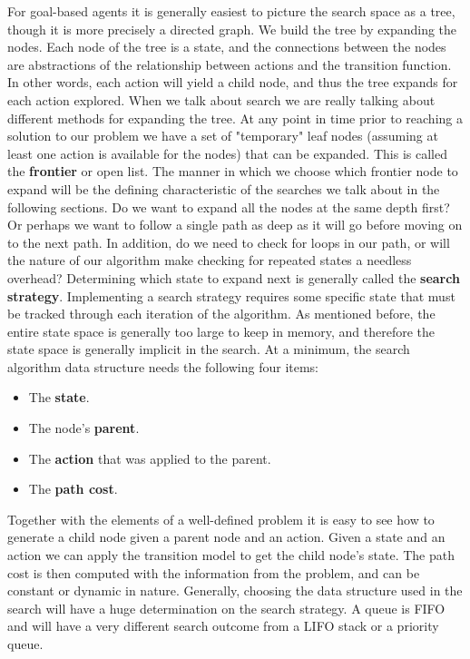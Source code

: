 \documentclass[a4paper,11pt]{report}
\begin{document}
For goal-based agents it is generally easiest to picture the search space as a
tree, though it is more precisely a directed graph.\cite{zhang99}  We build the
tree by expanding the nodes.  Each node of the tree is a state, and the
connections between the nodes are abstractions of the relationship between
actions and the transition function.  In other words, each action will yield a
child node, and thus the tree expands for each action explored.  When we talk
about search we are really talking about different methods for expanding the
tree.\newline
\indent At any point in time prior to reaching a solution to our problem we
have a set of "temporary" leaf nodes (assuming at least one action is available
for the nodes) that can be expanded.  This is called the \textbf{frontier}
or open list.\cite{norvig}  The manner in which we choose which frontier node
to expand will be the defining characteristic of the searches we talk about
in the following sections.  Do we want to expand all the nodes at the same
depth first?  Or perhaps we want to follow a single path as deep as it will go
before moving on to the next path.  In addition, do we need to check for loops
in our path, or will the nature of our algorithm make checking for repeated
states a needless overhead?  Determining which state to expand next is generally
called the \textbf{search strategy}.\cite{norvig}\newline
\indent Implementing a search strategy requires some specific state that must
be tracked through each iteration of the algorithm. As mentioned before, the
entire state space is generally too large to keep in memory, and therefore the
state space is generally implicit in the search.\cite{norvig} At a minimum, the
search algorithm data structure needs the following four items:

\begin{itemize}
\item The \textbf{state}.
\item The node's \textbf{parent}.
\item The \textbf{action} that was applied to the parent.
\item The \textbf{path cost}.\cite{norvig}
\end{itemize}

Together with the elements of a well-defined problem it is easy to see how to
generate a child node given a parent node and an action.  Given a state and an
action we can apply the transition model to get the child node's state.  The
path cost is then computed with the information from the problem, and can be
constant or dynamic in nature.  Generally, choosing the data structure used in 
the search will have a huge determination on the search strategy.  A queue 
is FIFO and will have a very different search outcome from a LIFO stack or a 
priority queue.\cite{norvig}\newline
\end{document}

